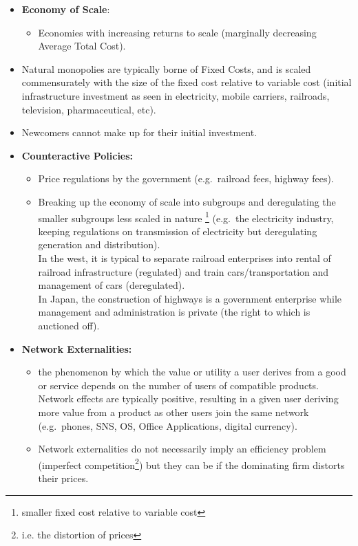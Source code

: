 \documentclass[
]{ltjarticle}
\providecommand{\tightlist}{%
  \setlength{\itemsep}{0pt}\setlength{\parskip}{0pt}}
\begin{document}
\begin{itemize}
\tightlist
\item
  \textbf{Economy of Scale}:

  \begin{itemize}
  \tightlist
  \item
    Economies with increasing returns to scale (marginally decreasing
    Average Total Cost).\\
  \end{itemize}
\item
  Natural monopolies are typically borne of Fixed Costs, and is scaled
  commensurately with the size of the fixed cost relative to variable
  cost (initial infrastructure investment as seen in electricity, mobile
  carriers, railroads, television, pharmaceutical, etc).\\
\item
  Newcomers cannot make up for their initial investment.\\
\item
  \textbf{Counteractive Policies:}

  \begin{itemize}
  \tightlist
  \item
    Price regulations by the government (e.g.~railroad fees, highway
    fees).\\
  \item
    Breaking up the economy of scale into subgroups and deregulating the
    smaller subgroups less scaled in nature
    \footnote{smaller fixed cost relative to variable cost} (e.g.~the
    electricity industry, keeping regulations on transmission of
    electricity but deregulating generation and distribution).\\
    In the west, it is typical to separate railroad enterprises into
    rental of railroad infrastructure (regulated) and train
    cars/transportation and management of cars (deregulated).\\
    In Japan, the construction of highways is a government enterprise
    while management and administration is private (the right to which
    is auctioned off).\\
  \end{itemize}
\item
  \textbf{Network Externalities:}

  \begin{itemize}
  \tightlist
  \item
    the phenomenon by which the value or utility a user derives from a
    good or service depends on the number of users of compatible
    products. Network effects are typically positive, resulting in a
    given user deriving more value from a product as other users join
    the same network (e.g.~phones, SNS, OS, Office Applications, digital
    currency).\\
  \item
    Network externalities do not necessarily imply an efficiency problem
    (imperfect competition\footnote{i.e. the distortion of prices}) but
    they can be if the dominating firm distorts their prices.
  \end{itemize}
\end{itemize}
\end{document}
